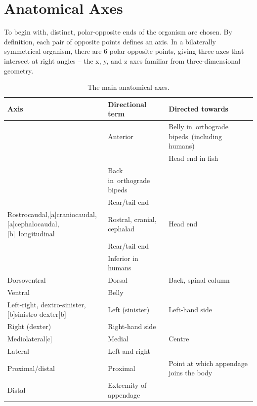 \hypertarget{anatomical-axes}{%
\section{Anatomical Axes}\label{anatomical-axes}}

To begin with, distinct, polar-opposite ends of the organism are chosen. By definition, each pair of opposite points defines an axis. In a bilaterally symmetrical organism, there are 6 polar opposite points, giving three axes that intersect at right angles -- the x, y, and z axes familiar from three-dimensional geometry.

\begin{longtable}[t]{>{\raggedright\arraybackslash}p{30em}>{\raggedright\arraybackslash}p{10em}>{\raggedright\arraybackslash}p{10em}}
\caption{\label{tab:axes}The main anatomical axes.}\\
\toprule
Axis & Directional term & Directed towards\\
\midrule
\rowcolor{gray!6}   & Anterior & Belly in orthograde bipeds (including humans)\\

\multirow{-2}{30em}{\raggedright\arraybackslash Anteroposterior} &  & Head end in fish\\
\cmidrule{1-3}
\rowcolor{gray!6}   & Back in orthograde bipeds & \\

\multirow{-2}{30em}{\raggedright\arraybackslash Posterior} & Rear/tail end & \\
\cmidrule{1-3}
\rowcolor{gray!6}  Rostrocaudal,[a]craniocaudal,[a]cephalocaudal,[b] longitudinal & Rostral, cranial, cephalad & Head end\\
\cmidrule{1-3}
 & Rear/tail end & \\

\rowcolor{gray!6}  \multirow{-2}{30em}{\raggedright\arraybackslash Caudal} & Inferior in humans & \\
\cmidrule{1-3}
Dorsoventral & Dorsal & Back, spinal column\\
\cmidrule{1-3}
\rowcolor{gray!6}  Ventral & Belly & \\
\cmidrule{1-3}
Left-right, dextro-sinister,[b]sinistro-dexter[b] & Left (sinister) & Left-hand side\\
\cmidrule{1-3}
\rowcolor{gray!6}  Right (dexter) & Right-hand side & \\
\cmidrule{1-3}
Mediolateral[c] & Medial & Centre\\
\cmidrule{1-3}
\rowcolor{gray!6}  Lateral & Left and right & \\
\cmidrule{1-3}
Proximal/distal & Proximal & Point at which appendage joins the body\\
\cmidrule{1-3}
\rowcolor{gray!6}  Distal & Extremity of appendage & \\
\bottomrule
\end{longtable}

